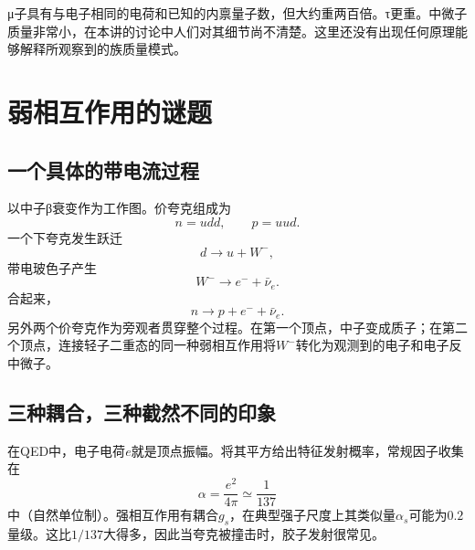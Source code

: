 {\proseunicodefont μ}子具有与电子相同的电荷和已知的内禀量子数，但大约重两百倍。{\proseunicodefont τ}更重。中微子质量非常小，在本讲的讨论中人们对其细节尚不清楚。这里还没有出现任何原理能够解释所观察到的族质量模式。

\begin{classroomqa}
\end{classroomqa}

\section{弱相互作用的谜题}

\subsection{一个具体的带电流过程}

以中子{\proseunicodefont β}衰变作为工作图。价夸克组成为
\begin{equation}
  n=udd,\qquad p=uud.
\end{equation}
一个下夸克发生跃迁
\begin{equation}
  d\longrightarrow u+W^-,
\end{equation}
带电玻色子产生
\begin{equation}
  W^-\longrightarrow e^-+\bar\nu_e.
\end{equation}
合起来，
\begin{equation}
  n\longrightarrow p+e^-+\bar\nu_e.
\end{equation}
另外两个价夸克作为旁观者贯穿整个过程。在第一个顶点，中子变成质子；在第二个顶点，连接轻子二重态的同一种弱相互作用将\(W^-\)转化为观测到的电子和电子反中微子。

\subsection{三种耦合，三种截然不同的印象}

在QED中，电子电荷\(e\)就是顶点振幅。将其平方给出特征发射概率，常规因子收集在
\begin{equation}
  \alpha=\frac{e^2}{4\pi}\simeq\frac1{137}
\end{equation}
中（自然单位制）。强相互作用有耦合\(g_s\)，在典型强子尺度上其类似量\(\alpha_s\)可能为\(0.2\)量级。这比\(1/137\)大得多，因此当夸克被撞击时，胶子发射很常见。

